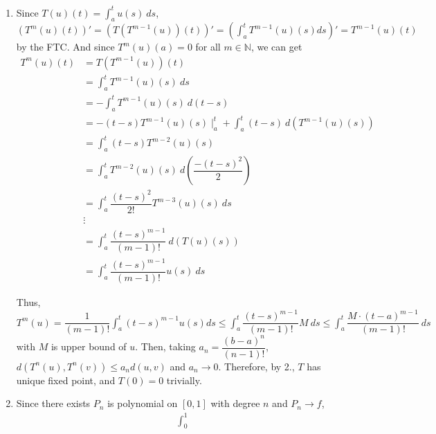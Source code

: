 \documentclass[12pt]{article}
\begin{document}
\begin{enumerate}
    \item Since $T(u)(t) = \displaystyle\int_a^t u(s)\ ds$, 
    $\left( T^m(u)(t)\right)' = \left( T(T^{m-1}(u))(t)\right)' = \left( \displaystyle\int_{a}^{t} T^{m-1}(u)(s) ds\right)' = T^{m-1}(u)(t)$ by the FTC.
    And since $T^m(u)(a) = 0$ for all $m\in \mathbb{N}$,
    we can get \begin{align*}
        T^{m}(u)(t) &= T(T^{m-1}(u))(t)\\
        &= \int_{a}^{t} T^{m-1}(u)(s)\ ds\\
        &= -\int_{a}^{t} T^{m-1}(u)(s)\ d(t-s)\\
        &= - (t-s) T^{m-1}(u)(s)\mid_a^t + \int_{a}^{t} (t-s)\ d(T^{m-1}(u)(s))\\
        &= \int_{a}^{t} (t-s)T^{m-2}(u)(s)\\
        &= \int_{a}^{t} T^{m-2}(u)(s)\ d(\dfrac{-(t-s)^2}{2})\\
        &= \int_{a}^{t} \dfrac{(t-s)^2}{2!} T^{m-3}(u)(s)\ ds\\
        &\vdots\\
        &= \int_{a}^{t} \dfrac{(t-s)^{m-1}}{(m-1)!} \ d(T(u)(s))\\
        &= \int_{a}^{t} \dfrac{(t-s)^{m-1}}{(m-1)!} u(s)\ ds
    \end{align*}

    Thus, $T^m(u) = \dfrac{1}{(m-1)!}\displaystyle\int_{a}^{t} (t-s)^{m-1} u(s) ds \leq \displaystyle\int_{a}^{t} \dfrac{(t-s)^{m-1}}{(m-1)!} M\ ds \leq \displaystyle\int_{a}^{t} \dfrac{M\cdot (t-a)^{m-1}}{(m-1)!}\ ds$
    with $M$ is upper bound of $u$. Then, taking $a_n = \dfrac{(b-a)^n}{(n-1)!}$, $d(T^n(u), T^n(v)) \leq a_n d(u, v)$ and $a_n \to 0$.
    Therefore, by 2., $T$ has unique fixed point, and $T(0) = 0$ trivially.

    \item Since there exists $P_n$ is polynomial on $[0, 1]$ with degree $n$ and $P_n \to f$,
    \begin{align*}
        \int_{0}^{1}
    \end{align*}
\end{enumerate}
\end{document}
